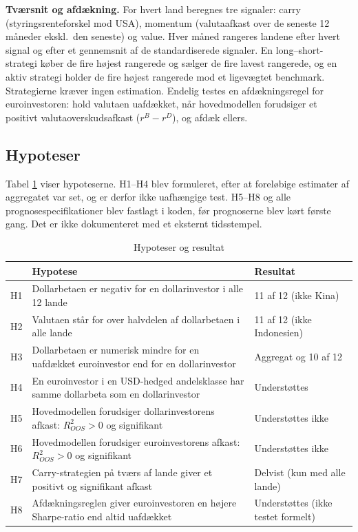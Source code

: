 \documentclass[11pt,a4paper]{article}
\begin{document}
\textbf{Tværsnit og afdækning.} For hvert land beregnes tre signaler: carry (styringsrenteforskel mod USA), momentum (valutaafkast over de seneste 12 måneder ekskl.\ den seneste) og value. Hver måned rangeres landene efter hvert signal og efter et gennemsnit af de standardiserede signaler. En long--short-strategi køber de fire højest rangerede og sælger de fire lavest rangerede, og en aktiv strategi holder de fire højest rangerede mod et ligevægtet benchmark. Strategierne kræver ingen estimation. Endelig testes en afdækningsregel for euroinvestoren: hold valutaen uafdækket, når hovedmodellen forudsiger et positivt valutaoverskudsafkast ($r^B - r^D$), og afdæk ellers.

\subsection{Hypoteser}
Tabel \ref{tab:hyp} viser hypoteserne. H1--H4 blev formuleret, efter at foreløbige estimater af aggregatet var set, og er derfor ikke uafhængige test. H5--H8 og alle prognosespecifikationer blev fastlagt i koden, før prognoserne blev kørt første gang. Det er ikke dokumenteret med et eksternt tidsstempel.

\begin{table}[htbp]
\centering
\caption{Hypoteser og resultat}
\label{tab:hyp}
\small
\begin{tabular}{p{0.6cm}p{10.2cm}p{3.3cm}}
\toprule
& Hypotese & Resultat \\
\midrule
H1 & Dollarbetaen er negativ for en dollarinvestor i alle 12 lande & 11 af 12 (ikke Kina) \\
H2 & Valutaen står for over halvdelen af dollarbetaen i alle lande & 11 af 12 (ikke Indonesien) \\
H3 & Dollarbetaen er numerisk mindre for en uafdækket euroinvestor end for en dollarinvestor & Aggregat og 10 af 12 \\
H4 & En euroinvestor i en USD-hedged andelsklasse har samme dollarbeta som en dollarinvestor & Understøttes \\
\midrule
H5 & Hovedmodellen forudsiger dollarinvestorens afkast: $R^2_{OOS}>0$ og signifikant & Understøttes ikke \\
H6 & Hovedmodellen forudsiger euroinvestorens afkast: $R^2_{OOS}>0$ og signifikant & Understøttes ikke \\
H7 & Carry-strategien på tværs af lande giver et positivt og signifikant afkast & Delvist (kun med alle lande) \\
H8 & Afdækningsreglen giver euroinvestoren en højere Sharpe-ratio end altid uafdækket & Understøttes (ikke testet formelt) \\
\bottomrule
\end{tabular}
\end{table}
\end{document}
